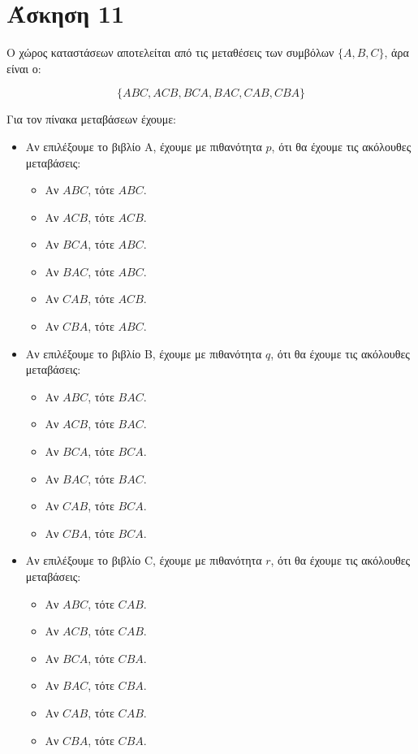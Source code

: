 \documentclass{article}
\newcommand{\english}[1]{\foreignlanguage{english}{{#1}}}
\begin{document}
\section*{Άσκηση 11}

Ο χώρος καταστάσεων αποτελείται από τις μεταθέσεις των συμβόλων $\{A, B, C\}$, άρα είναι ο:

$$
\{ABC, ACB, BCA, BAC, CAB, CBA\}
$$

Για τον πίνακα μεταβάσεων έχουμε:
\begin{itemize}
    \item Αν επιλέξουμε το βιβλίο Α, έχουμε με πιθανότητα $p$, ότι θα έχουμε τις ακόλουθες μεταβάσεις:
    \begin{itemize}
        \item Αν $ABC$, τότε $ABC$.
        \item Αν $ACB$, τότε $ACB$.
        \item Αν $BCA$, τότε $ABC$.
        \item Αν $BAC$, τότε $ABC$.
        \item Αν $CAB$, τότε $ACB$.
        \item Αν $CBA$, τότε $ABC$.
    \end{itemize}
    \item Αν επιλέξουμε το βιβλίο B, έχουμε με πιθανότητα $q$, ότι θα έχουμε τις ακόλουθες μεταβάσεις:
    \begin{itemize}
        \item Αν $ABC$, τότε $BAC$.
        \item Αν $ACB$, τότε $BAC$.
        \item Αν $BCA$, τότε $BCA$.
        \item Αν $BAC$, τότε $BAC$.
        \item Αν $CAB$, τότε $BCA$.
        \item Αν $CBA$, τότε $BCA$.
    \end{itemize}
    \item Αν επιλέξουμε το βιβλίο \english{C}, έχουμε με πιθανότητα $r$, ότι θα έχουμε τις ακόλουθες μεταβάσεις:
    \begin{itemize}
        \item Αν $ABC$, τότε $CAB$.
        \item Αν $ACB$, τότε $CAB$.
        \item Αν $BCA$, τότε $CBA$.
        \item Αν $BAC$, τότε $CBA$.
        \item Αν $CAB$, τότε $CAB$.
        \item Αν $CBA$, τότε $CBA$.
    \end{itemize}
\end{itemize}
\end{document}
